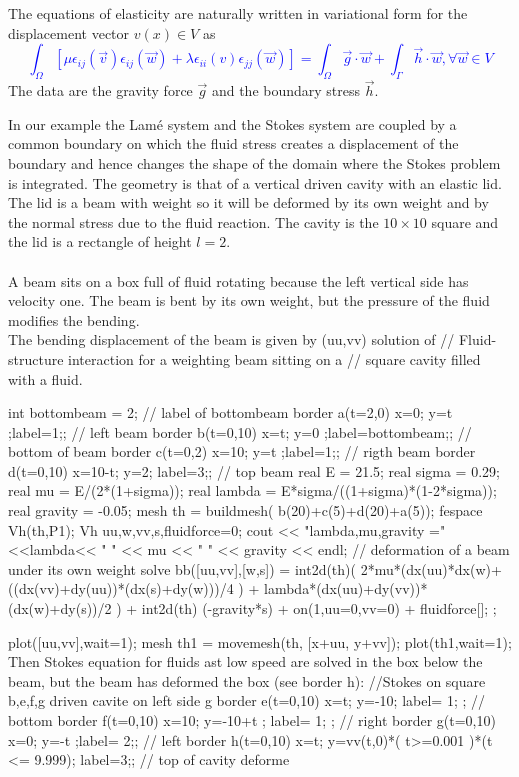 \documentclass[twoside]{book}
\def\Blue#1{\textcolor{blue}{#1}}
\begin{document}
The equations of elasticity are naturally written in variational form
for the displacement vector $v(x)\in V$ as
\Blue{$$
\int_\Omega [\mu\epsilon_{ij}(\vec v)\epsilon_{ij}(\vec w)
+\lambda \epsilon_{ii}(v)\epsilon_{jj}(\vec w)]
=\int_\Omega \vec g\cdot \vec w +\int_\Gamma \vec h\cdot \vec w,%
\forall \vec w\in V
$$}
The data are the gravity force $\vec g$ and the
boundary stress $\vec h$.

In our example the Lam\'e system and the Stokes system are coupled by a
common boundary on which
the fluid  stress creates a displacement of the boundary and hence
changes the shape of the domain where the Stokes problem is integrated.
The geometry is that of a vertical driven cavity with an elastic lid.
The lid is a beam with weight so it will
be deformed by its own weight and by the normal stress due to the fluid reaction.
The cavity is the $10 \times 10$ square and the lid is a rectangle of height $l=2$.
\\\\
A beam sits on a box full of fluid rotating because the left vertical side has velocity one.
The beam is bent by its own weight, but the pressure of the fluid modifies the bending.
\\
The bending displacement of the beam is given by (uu,vv) solution of
\bFF
\huge
//  Fluid-structure interaction for a weighting beam sitting on a
// square cavity filled with a fluid.

int bottombeam = 2; // label of bottombeam
border a(t=2,0)  { x=0; y=t ;label=1;};        //  left beam
border b(t=0,10) { x=t; y=0 ;label=bottombeam;};        //  bottom of beam
border c(t=0,2)  { x=10; y=t ;label=1;};       //  rigth beam
border d(t=0,10) { x=10-t; y=2; label=3;};     //  top beam
real E = 21.5;
real sigma = 0.29;
real mu = E/(2*(1+sigma));
real lambda = E*sigma/((1+sigma)*(1-2*sigma));
real gravity = -0.05;
mesh th = buildmesh( b(20)+c(5)+d(20)+a(5));
fespace Vh(th,P1);
Vh uu,w,vv,s,fluidforce=0;
cout << "lambda,mu,gravity ="<<lambda<< " " << mu << " " << gravity << endl;
// deformation of a beam under its own weight
solve  bb([uu,vv],[w,s])  =
    int2d(th)(
                 2*mu*(dx(uu)*dx(w)+ ((dx(vv)+dy(uu))*(dx(s)+dy(w)))/4 )
               + lambda*(dx(uu)+dy(vv))*(dx(w)+dy(s))/2
             )
  + int2d(th) (-gravity*s)
  + on(1,uu=0,vv=0)
  + fluidforce[];
 ;

 plot([uu,vv],wait=1);
 mesh th1 = movemesh(th, [x+uu, y+vv]);
 plot(th1,wait=1);
\eFF
\huge
Then Stokes equation for fluids ast low speed are solved in the box below the beam,
but the beam has deformed the box (see border h):
\bFF
\huge
//Stokes on square  b,e,f,g  driven cavite on left side g
border e(t=0,10) { x=t; y=-10; label= 1; };      //  bottom
border f(t=0,10) { x=10; y=-10+t ; label= 1; };   //  right
border g(t=0,10) { x=0; y=-t ;label= 2;};       //  left
border h(t=0,10) { x=t; y=vv(t,0)*( t>=0.001 )*(t <= 9.999); 
                    label=3;};   //  top of cavity deforme
\end{document}

